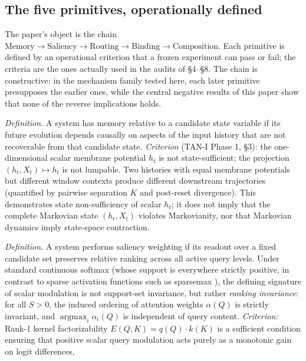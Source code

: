 \subsection{The five primitives, operationally defined}
\label{sec:primitives}

The paper's object is the chain
$\text{Memory}\to\text{Saliency}\to\text{Routing}\to\text{Binding}\to
\text{Composition}$. Each primitive is defined by an operational criterion
that a frozen experiment can pass or fail; the criteria are the ones
actually used in the audits of §4--§8. The chain is constructive: in the
mechanism family tested here, each later primitive presupposes the earlier
ones, while the central negative results of this paper show that none of
the reverse implications holds.

\begin{description}[style=nextline,leftmargin=2em]
\item[P1 --- Memory.] \emph{Definition.} A system has memory relative to a candidate
state variable if its future evolution depends causally on aspects of the input history
that are not recoverable from that candidate state. \emph{Criterion} (TAN-I Phase 1, §3):
the one-dimensional scalar membrane potential $h_t$ is not state-sufficient; the projection
$(h_t,X_t)\mapsto h_t$ is not lumpable. Two histories with equal membrane potentials but
different window contexts produce different downstream trajectories (quantified by pairwise
separation $K$ and post-reset divergence). This demonstrates state non-sufficiency of scalar $h_t$;
it does not imply that the complete Markovian state $(h_t, X_t)$ violates Markovianity, nor
that Markovian dynamics imply state-space contraction.
\item[P2 --- Saliency weighting.] \emph{Definition.} A system performs saliency weighting
if its readout over a fixed candidate set preserves relative ranking across all active query
levels. Under standard continuous softmax (whose support is everywhere strictly positive,
in contrast to sparse activation functions such as sparsemax \citep{martins2016}), the defining
signature of scalar modulation is not support-set invariance, but rather \emph{ranking invariance}:
for all $S>0$, the induced ordering of attention weights $\alpha(Q)$ is strictly invariant,
and $\operatorname{argmax}_i\alpha_i(Q)$ is independent of query content. \emph{Criterion:}
Rank-1 kernel factorizability $E(Q, K) = q(Q)\cdot k(K)$ is a sufficient condition ensuring
that positive scalar query modulation acts purely as a monotonic gain on logit differences,

\end{description}
